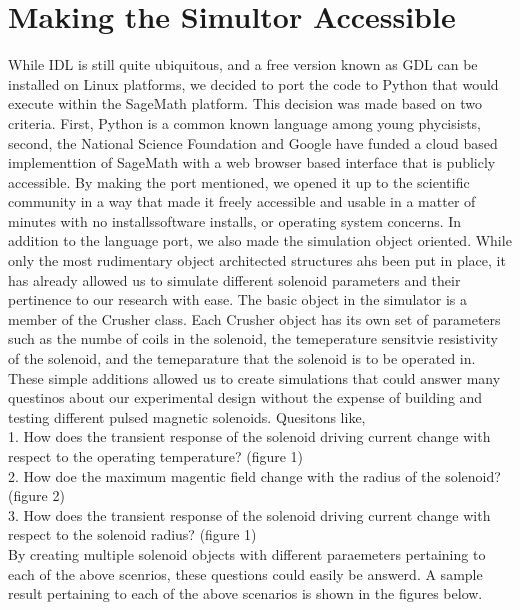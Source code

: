 \documentclass[prb,preprint]{revtex4-1}
\begin{document}
\section{Making the Simultor Accessible}
While IDL is still quite ubiquitous, and a free version known as GDL can be installed on Linux platforms, we decided to port the code to Python that would execute within the SageMath platform.  This decision was made based on two criteria.  First, Python is a common known language among young phycisists, second, the National Science Foundation and Google have funded a cloud based implementtion of SageMath with a web browser based interface that is publicly accessible.  By making the port mentioned, we opened it up to the scientific community in a way that made it freely accessible and usable in a matter of minutes with no installssoftware installs, or operating system concerns.
In addition to the language port, we also made the simulation object oriented.  While only the most rudimentary object architected structures ahs been put in place, it has already allowed us to simulate different solenoid parameters and their pertinence to our research with ease.  The basic object in the simulator is a member of the Crusher class.  Each Crusher object has its own set of parameters such as the numbe of coils in the solenoid, the temeperature sensitvie resistivity of the solenoid, and the temeparature that the solenoid is to be operated in.
These simple additions allowed us to create simulations that could answer many questinos about our experimental design without the expense of building and testing different pulsed magnetic solenoids.  Quesitons like, 
\\
1.  How does the transient response of the solenoid driving current change with respect to the operating temperature? (figure 1) 
\\
2.  How doe the maximum magentic field change with the radius of the solenoid? (figure 2) 
\\
3.  How does the transient response of the solenoid driving current change with respect to the solenoid radius? (figure 1) 
\\
By creating multiple solenoid objects with different paraemeters pertaining to each of the above scenrios, these questions could easily be answerd.  A sample result pertaining to each of the above scenarios is shown in the figures below.
\end{document}

